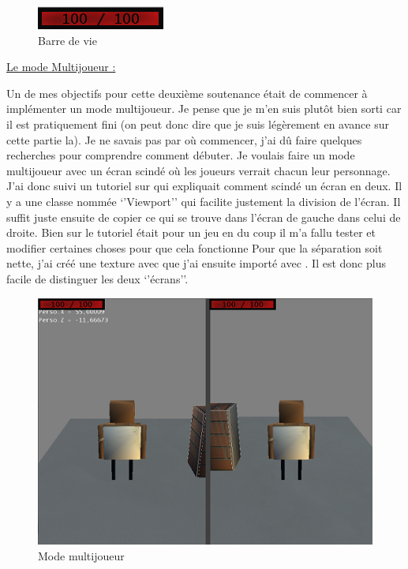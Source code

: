 \documentclass{article}
\begin{document}
\begin{figure}[h]
\begin{center}
\includegraphics[scale=1.5]{Barredevie.png}
\caption{Barre de vie}
\end{center}
\end{figure}

\underline{Le mode Multijoueur :}
\newline

\par
Un de mes objectifs pour cette deuxième soutenance était de commencer à implémenter un mode multijoueur. Je pense que je m’en suis plutôt bien sorti car il est pratiquement fini (on peut donc dire que je suis légèrement en avance sur cette partie la). Je ne savais pas par où commencer, j’ai dû faire quelques recherches pour comprendre comment débuter. Je voulais faire un mode multijoueur avec un écran scindé où les joueurs verrait chacun leur personnage. J’ai donc suivi un tutoriel sur  qui expliquait comment scindé un écran en deux. Il y a une classe nommée ‘’Viewport’’ qui facilite justement la division de l’écran. Il suffit juste ensuite de copier ce qui se trouve dans l’écran de gauche dans celui de droite. Bien sur le tutoriel était pour un jeu en  du coup il m’a fallu tester et modifier certaines choses pour que cela fonctionne
\newline
Pour que la séparation soit nette, j’ai créé une texture avec  que j’ai ensuite importé avec . Il est donc plus facile de distinguer les deux ‘’écrans’’. 
\newpage
\begin{figure}[h]
\begin{center}
\includegraphics[scale=1]{Multijoueur.png}
\caption{Mode multijoueur}
\end{center}
\end{figure}
\end{document}
